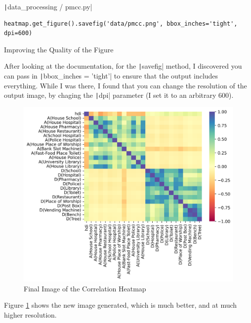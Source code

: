 \documentclass[12pt]{report}
\newcommand{\pil}[1]{\protect\texttt|#1|}
\begin{document}
\begin{listing}[H]
\pil{data_processing / pmcc.py}
\begin{verbatim}
heatmap.get_figure().savefig('data/pmcc.png', bbox_inches='tight', dpi=600)
\end{verbatim}
\caption{Improving the Quality of the Figure}\label{cs:improveQualityOfFigure}
\end{listing}

After looking at the documentation, for the \pil{savefig} method, I discovered you can pass in \pil{bbox_inches = 'tight'} to ensure that the output includes everything. While I was there, I found that you can change the resolution of the output image, by chaging the \pil{dpi} parameter (I set it to an arbitrary 600). 

\begin{figure}[H]
\centering
\includegraphics[width=13cm]{ss18.2.png}
\caption{Final Image of the Correlation Heatmap}\label{fig:ss18.2}
\end{figure}

Figure \ref{fig:ss18.2} shows the new image generated, which is much better, and at much higher resolution.

\begin{center}
\end{center}
\end{document}
